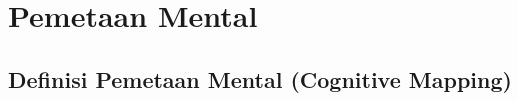 \documentclass[../manperil.tex]{subfiles}
\begin{document}
\section{Pemetaan Mental}%
\label{sec:Pemetaan Mental}


\subsection{Definisi Pemetaan Mental (Cognitive Mapping)}%
\label{sub:Definisi Pemetaan Mental (Cognitive Mapping)}




\end{document}
